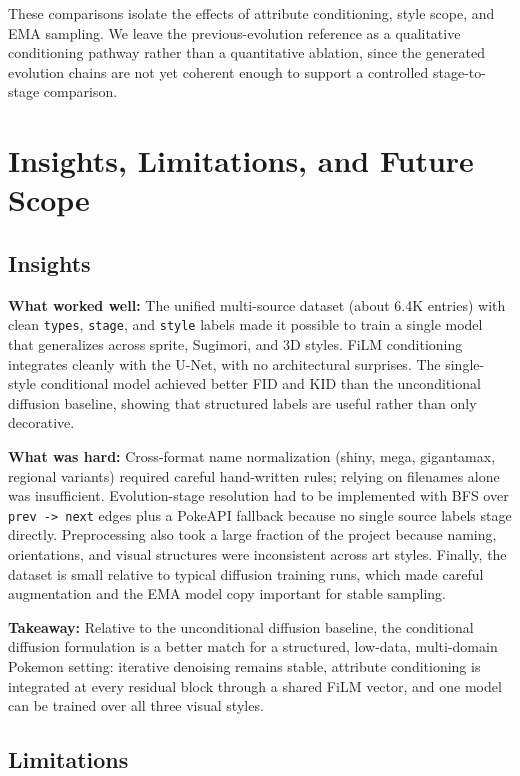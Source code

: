 \documentclass[
]{article}
\begin{document}
These comparisons isolate the effects of attribute conditioning, style
scope, and EMA sampling. We leave the previous-evolution reference as a
qualitative conditioning pathway rather than a quantitative ablation,
since the generated evolution chains are not yet coherent enough to
support a controlled stage-to-stage comparison.

\section{Insights, Limitations, and Future
Scope}\label{insights-limitations-and-future-scope}

\subsection{Insights}\label{insights}

\textbf{What worked well:} The unified multi-source dataset (about 6.4K
entries) with clean \texttt{types}, \texttt{stage}, and \texttt{style}
labels made it possible to train a single model that generalizes across
sprite, Sugimori, and 3D styles. FiLM conditioning integrates cleanly
with the U-Net, with no architectural surprises. The single-style
conditional model achieved better FID and KID than the unconditional
diffusion baseline, showing that structured labels are useful rather
than only decorative.

\textbf{What was hard:} Cross-format name normalization (shiny, mega,
gigantamax, regional variants) required careful hand-written rules;
relying on filenames alone was insufficient. Evolution-stage resolution
had to be implemented with BFS over \texttt{prev\ -\textgreater{}\ next}
edges plus a PokeAPI fallback because no single source labels stage
directly. Preprocessing also took a large fraction of the project because
naming, orientations, and visual structures were inconsistent across art
styles. Finally, the dataset is small relative to typical diffusion
training runs, which made careful augmentation and the EMA model copy
important for stable sampling.

\textbf{Takeaway:} Relative to the unconditional diffusion baseline, the
conditional diffusion formulation is a better match for a structured,
low-data, multi-domain Pokemon setting: iterative denoising remains
stable, attribute conditioning is integrated at every residual block
through a shared FiLM vector, and one model can be trained over all three
visual styles.

\subsection{Limitations}\label{limitations}
\end{document}
